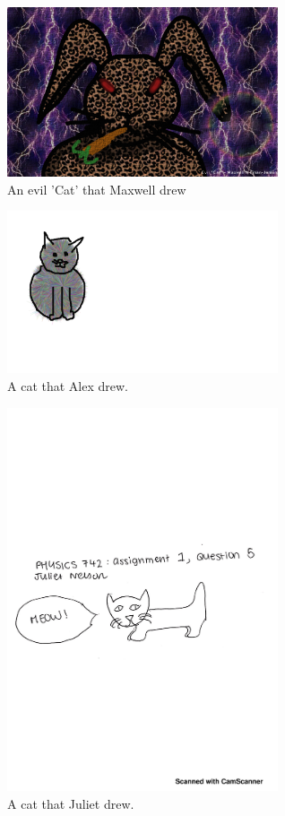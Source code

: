 \begin{centering}
\begin{figure}
	\includegraphics[width=8cm]{catto.pdf}
  \caption{An evil 'Cat' that Maxwell drew}
  \label{fig:catto}
\end{figure}



\begin{figure}
	\includegraphics[width=8cm]{cat742afer228.pdf}
  \caption{A cat that Alex drew.}
  \label{fig:cat_alex}
\end{figure}


\begin{figure}[H]
	\centering
	\includegraphics[width=8cm]{catjuliet.pdf}
	\caption{A cat that Juliet drew.}
	\label{fig:cat2}
\end{figure}




\end{centering}

